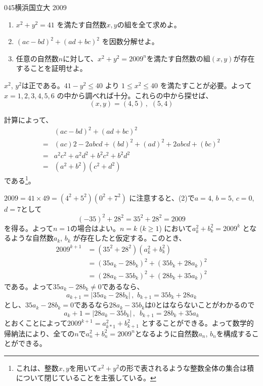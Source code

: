 \begin{prob}{045}{}{横浜国立大 2009}
 \begin{enumerate}
  \item $x^2+y^2=41$ を満たす自然数$x,y$の組を全て求めよ。
  \item $(ac-bd)^2+(ad+bc)^2$ を因数分解せよ。
  \item 任意の自然数$n$に対して、$x^2+y^2=2009^n$を満たす自然数の組$(x,y)$が存在することを証明せよ。
 \end{enumerate}
\end{prob}

$x^2$, $y^2$は正である。$41-y^2\le 40$ より $1\le x^2\le 40$ を満たすことが必要。よって$x=1,2,3,4,5,6$ の中から調べれば十分。これらの中から探せば、
\[ (x,y)=(4,5)\,,\,\, (5,4) \]

計算によって、
\begin{align*}
 &(ac-bd)^2+(ad+bc)^2 \\
 =& (ac)2-2abcd+(bd)^2+(ad)^2+2abcd+(bc)^2 \\
 =& a^2c^2+a^2d^2+b^2c^2+b^2d^2 \\
 =& (a^2+b^2)(c^2+d^2)
\end{align*}
である\footnote{これは、整数$x,y$を用いて$x^2+y^2$の形で表されるような整数全体の集合は積について閉じていることを主張している。}。

$2009=41\times49=(4^2+5^2)(0^2+7^2)$ に注意すると、(2)で$a=4$, $b=5$, $c=0$, $d=7$として
\[ (-35)^2+28^2=35^2+28^2=2009 \]
を得る。よって$n=1$の場合はよい。$n=k$ ($k\ge 1$) において$a_k^2+b_k^2=2009^k$ となるような自然数$a_k$, $b_k$ が存在したと仮定する。このとき、
\begin{align*}
 2009^{k+1}&=(35^2+28^2)(a_k^2+b_k^2) \\
 &=(35a_k-28b_k)^2+(35b_k+28a_k)^2 \\
 &=(28a_k-35b_k)^2+(28b_k+35a_k)^2
\end{align*}
である。よって$35a_k-28b_k\neq 0$であるなら、
\[ a_{k+1}=|35a_k-28b_k| \,,\,\, b_{k+1}=35b_k+28a_k \]
とし、$35a_k-28b_k=0$であるなら$28a_k-35b_k$は0とはならないことがわかるので
\[ a_k+1=|28a_k-35b_k| \,,\,\,\, b_{k+1}=28b_k+35a_k \]
とおくことによって$2009^{k+1}=a_{k*1}^2+b_{k+1}^2$ とすることができる。よって数学的帰納法により、全ての$n$で$a_n^2+b_n^2=2009^n$となるように自然数$a_n$, $b_n$を構成することができる。